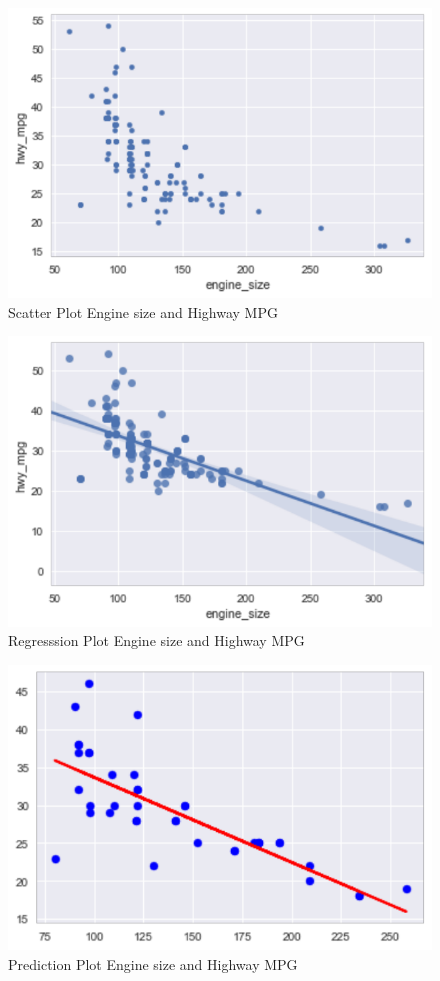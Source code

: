 \begin{figure}[htb]
\includegraphics[width=1.0\columnwidth]{images/scatterplot.pdf}
  \caption{Scatter Plot Engine size and Highway MPG}
  \label{p:scatterplt}
\end{figure}

\begin{figure}[htb]
\includegraphics[width=1.0\columnwidth]{images/reg_plot.pdf}
  \caption{Regresssion Plot Engine size and Highway MPG}
  \label{p:regplt}
\end{figure}

\begin{figure}[htb]
\includegraphics[width=1.0\columnwidth]{images/plot_pred_test_set.pdf}
  \caption{Prediction Plot Engine size and Highway MPG}
  \label{p:predplt}
\end{figure}


 
